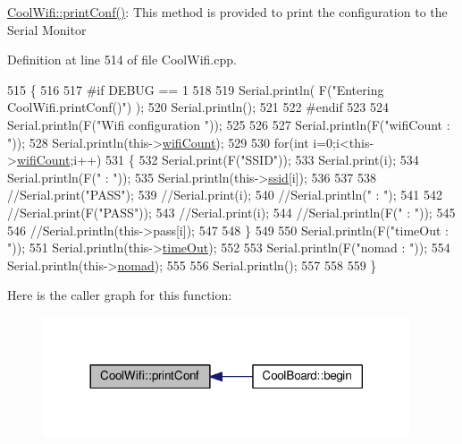 \hyperlink{class_cool_wifi_a9e6105c6d13d35ec510f6633da9e0223}{Cool\+Wifi\+::print\+Conf()}\+: This method is provided to print the configuration to the Serial Monitor 

Definition at line 514 of file Cool\+Wifi.\+cpp.


\begin{DoxyCode}
515 \{
516 
517 \textcolor{preprocessor}{#if DEBUG == 1 }
518 
519     Serial.println( F(\textcolor{stringliteral}{"Entering CoolWifi.printConf()"}) );
520     Serial.println();   
521 
522 \textcolor{preprocessor}{#endif}
523     
524     Serial.println(F(\textcolor{stringliteral}{"Wifi configuration "}));
525 
526     
527     Serial.println(F(\textcolor{stringliteral}{"wifiCount : "}));
528     Serial.println(this->\hyperlink{class_cool_wifi_ab133bd92fcb895b884deecd6678592e4}{wifiCount});
529     
530     \textcolor{keywordflow}{for}(\textcolor{keywordtype}{int} i=0;i<this->\hyperlink{class_cool_wifi_ab133bd92fcb895b884deecd6678592e4}{wifiCount};i++)
531     \{   
532         Serial.print(F(\textcolor{stringliteral}{"SSID"}));
533         Serial.print(i);
534         Serial.println(F(\textcolor{stringliteral}{" : "}));
535         Serial.println(this->\hyperlink{class_cool_wifi_a893b21d0fed821438733bba2e73fb4c2}{ssid}[i]);
536                 
537 
538         \textcolor{comment}{//Serial.print("PASS");}
539         \textcolor{comment}{//Serial.print(i);}
540         \textcolor{comment}{//Serial.println(" : ");}
541 
542         \textcolor{comment}{//Serial.print(F("PASS"));}
543         \textcolor{comment}{//Serial.print(i);}
544         \textcolor{comment}{//Serial.println(F(" : "));}
545 
546         \textcolor{comment}{//Serial.println(this->pass[i]);}
547         
548     \}
549     
550     Serial.println(F(\textcolor{stringliteral}{"timeOut : "}));
551     Serial.println(this->\hyperlink{class_cool_wifi_a952111605f25156588b5632caaba1c6f}{timeOut});
552 
553     Serial.println(F(\textcolor{stringliteral}{"nomad : "}));
554     Serial.println(this->\hyperlink{class_cool_wifi_ab7d9643c4af7bac3be331ef008b2ea27}{nomad});
555 
556     Serial.println();
557 
558 
559 \}
\end{DoxyCode}
Here is the caller graph for this function\+:\nopagebreak
\begin{figure}[H]
\begin{center}
\leavevmode
\includegraphics[width=308pt]{d7/d29/class_cool_wifi_a9e6105c6d13d35ec510f6633da9e0223_icgraph}
\end{center}
\end{figure}
\mbox{\label{class_cool_wifi_a1c7b4d82a4098d346e7593dce92039fa}} 
